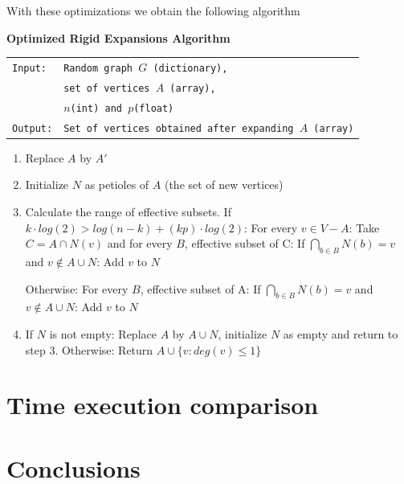 With these optimizations we obtain the following algorithm

\begin{cajita}
\textbf{Optimized Rigid Expansions Algorithm} \hfill \break

\begin{tabular}{ l l }
\texttt{Input:} &  \texttt{Random graph $G$ (dictionary),} \\
                &  \texttt{set of vertices $A$ (array),} \\
                &  \texttt{$n$(int) and $p$(float)} \\
\texttt{Output:} & \texttt{Set of vertices obtained after expanding $A$ (array)} \\
\end{tabular}
\begin{enumerate}
\item Replace $A$ by $A'$
\item Initialize $N$ as petioles of $A$ (the set of new vertices)
\item Calculate the range of effective subsets.\hfill \break
If $k\cdot log(2) > log(n-k) + (kp)\cdot log(2)$: \hfill \break
\hphantom{12} For every $v\in V-A$:\hfill \break
\hphantom{1234} Take $C = A\cap N(v)$ and for every $B$, effective subset of C:\hfill \break
\hphantom{123456} If $\bigcap\limits_{b\in B} N(b) = v$ and $v\not\in A\cup N$: \hfill \break
\hphantom{12341234} Add $v$ to $N$

Otherwise:\hfill \break
\hphantom{12} For every $B$, effective subset of A:\hfill \break
\hphantom{1234} If $\bigcap\limits_{b\in B} N(b) = v$ and $v\not\in A\cup N$: \hfill \break
\hphantom{123456} Add $v$ to $N$

\item If $N$ is not empty: \hfill \break
\hphantom{12} Replace $A$ by $A\cup N$, initialize $N$ as empty and return to step 3. \hfill \break
      Otherwise:\hfill \break
\hphantom{12} Return $A\cup\{v: deg(v)\leq 1 \}$
\end{enumerate}
\end{cajita}

\section{Time execution comparison}

\section{Conclusions}

